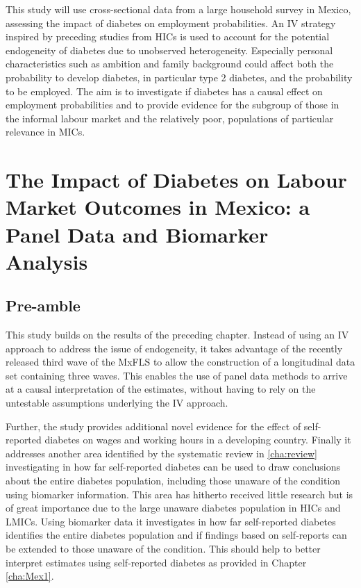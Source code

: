 This study will use cross-sectional data from a large household survey in Mexico, assessing the impact of diabetes on employment probabilities. An \ac{IV} strategy inspired by preceding studies from \acp{HIC} is used to account for the potential endogeneity of diabetes due to unobserved heterogeneity. Especially personal characteristics such as ambition and family background could affect both the probability to develop diabetes, in particular type 2 diabetes, and the probability to be employed. The aim is to investigate if diabetes has a causal effect on employment probabilities and to provide evidence for the subgroup of those in the informal labour market and the relatively poor, populations of particular relevance in \acp{MIC}.

\acresetall  %
\chapter{\label{cha:Mex2}The Impact of Diabetes on Labour Market Outcomes in Mexico: a Panel Data and Biomarker Analysis}
\section*{Pre-amble}

This study builds on the results of the preceding chapter. Instead of using an \ac{IV} approach to address the issue of endogeneity, it takes advantage of the recently released third wave of the \ac{MxFLS} to allow the construction of a longitudinal data set containing three waves. This enables the use of panel data methods to arrive at a causal interpretation of the estimates, without having to rely on the untestable assumptions underlying the \ac{IV} approach.

Further, the study provides additional novel evidence for the effect of self-reported diabetes on wages and working hours in a developing country. Finally it addresses another area identified by the systematic review in \ref{cha:review} investigating in how far self-reported diabetes can be used to draw conclusions about the entire diabetes population, including those unaware of the condition using biomarker information. This area has hitherto received little research but is of great importance due to the large unaware diabetes population in \acp{HIC} and \acp{LMIC}. Using biomarker data it investigates in how far self-reported diabetes identifies the entire diabetes population and if findings based on self-reports can be extended to those unaware of the condition. This should help to better interpret estimates using self-reported diabetes as provided in Chapter \ref{cha:Mex1}.

